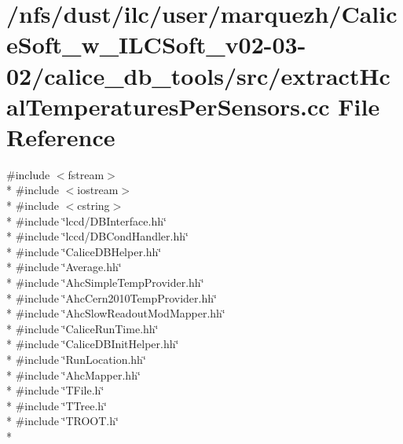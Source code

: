 \section{/nfs/dust/ilc/user/marquezh/\-Calice\-Soft\-\_\-w\-\_\-\-I\-L\-C\-Soft\-\_\-v02-\/03-\/02/calice\-\_\-db\-\_\-tools/src/extract\-Hcal\-Temperatures\-Per\-Sensors.cc File Reference}
\label{extractHcalTemperaturesPerSensors_8cc}
{\ttfamily \#include $<$fstream$>$}\\*
{\ttfamily \#include $<$iostream$>$}\\*
{\ttfamily \#include $<$cstring$>$}\\*
{\ttfamily \#include \char`\"{}lccd/\-D\-B\-Interface.\-hh\char`\"{}}\\*
{\ttfamily \#include \char`\"{}lccd/\-D\-B\-Cond\-Handler.\-hh\char`\"{}}\\*
{\ttfamily \#include \char`\"{}Calice\-D\-B\-Helper.\-hh\char`\"{}}\\*
{\ttfamily \#include \char`\"{}Average.\-hh\char`\"{}}\\*
{\ttfamily \#include \char`\"{}Ahc\-Simple\-Temp\-Provider.\-hh\char`\"{}}\\*
{\ttfamily \#include \char`\"{}Ahc\-Cern2010\-Temp\-Provider.\-hh\char`\"{}}\\*
{\ttfamily \#include \char`\"{}Ahc\-Slow\-Readout\-Mod\-Mapper.\-hh\char`\"{}}\\*
{\ttfamily \#include \char`\"{}Calice\-Run\-Time.\-hh\char`\"{}}\\*
{\ttfamily \#include \char`\"{}Calice\-D\-B\-Init\-Helper.\-hh\char`\"{}}\\*
{\ttfamily \#include \char`\"{}Run\-Location.\-hh\char`\"{}}\\*
{\ttfamily \#include \char`\"{}Ahc\-Mapper.\-hh\char`\"{}}\\*
{\ttfamily \#include \char`\"{}T\-File.\-h\char`\"{}}\\*
{\ttfamily \#include \char`\"{}T\-Tree.\-h\char`\"{}}\\*
{\ttfamily \#include \char`\"{}T\-R\-O\-O\-T.\-h\char`\"{}}\\*
